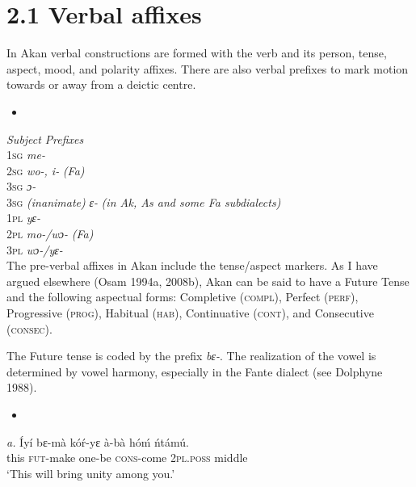 \documentclass[output=paper]{langsci/langscibook}
\begin{document}
\section{2.1  Verbal affixes}

In Akan verbal constructions are  formed with the verb and its person, tense, aspect, mood, and polarity affixes. There are also verbal prefixes to mark motion towards or away from a deictic centre.

\begin{itemize}
\item \ea\label{ex:}
\\
\end{itemize}
     \emph{        }\emph{\textup{Subject }}\emph{\textup{Prefixes}}\\
     \textsc{1sg  }\emph{\textup{      }}\emph{me-}\\
     \textsc{2sg  }\emph{      wo-, i- }\emph{\textup{(Fa)}}\\
     \textsc{3sg  }\emph{      ɔ{}-}\\
     \textsc{3sg}\emph{\textup{ (inanimate)}}\emph{    ɛ{}- }\emph{\textup{(in Ak, As and some Fa subdialects)}}\\
     \textsc{1pl  }\emph{      yɛ-}\\
     \textsc{2pl  }\emph{      mo-/wɔ- }\emph{\textup{(Fa)}}\emph{  }\\
     \textsc{3pl  }\emph{      wɔ-/yɛ-}\\
The pre-verbal affixes in Akan include the tense/aspect markers. As I have argued elsewhere (Osam 1994a, 2008b), Akan can be said to have a Future Tense and the following aspectual forms: Completive (\textsc{compl}), Perfect (\textsc{perf}), Progressive (\textsc{prog}), Habitual (\textsc{hab}), Continuative (\textsc{cont}), and Consecutive (\textsc{consec}).

The Future tense is coded by the prefix \emph{bɛ-}. The realization of the vowel is determined by vowel harmony, especially in the Fante dialect (see Dolphyne 1988).

\begin{itemize}
\item \end{itemize}
\gll \emph{a.}  \'{I}y\'{i}  bɛ-m\`{a}    k\'{o}\'{r}-yɛ    \`{a}-b\`{a}    h\'{o}\'{m}    \'{n}t\'{a}m\'{u}.\\
       this  \textsc{fut}{}-make  one-be    \textsc{cons}{}-come  \textsc{2pl.poss}  middle\\
\glt ‘This will bring unity among you.’ \citep[79]{Krampah1970}
\z
\end{document}
